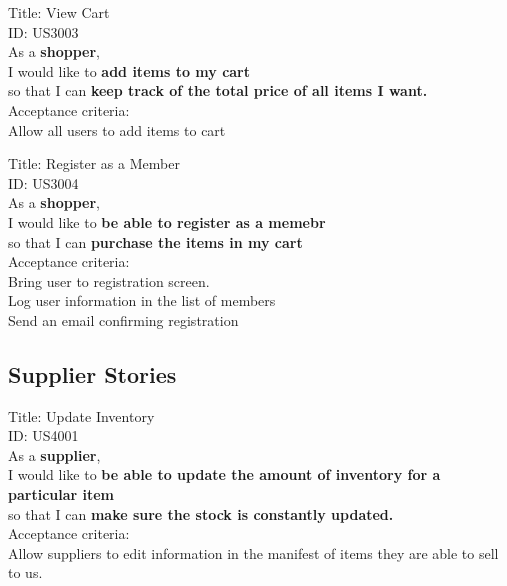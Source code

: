 \documentclass{article}
\begin{document}
\begin{framed}
\noindent
Title: View Cart \\
ID: US3003 \\
As a \textbf{shopper},\\
 \textbullet  \quad \quad I would like to \textbf{add items to my cart}\\ 
 \textbullet  \quad \quad so that I can \textbf{keep track of the total price of all items I want.}\\
 Acceptance criteria: \\
  \textbullet  \quad \quad Allow all users to add items to cart \\
\end{framed}


\begin{framed}
\noindent
Title: Register as a Member\\
ID: US3004 \\
As a \textbf{shopper},\\
 \textbullet  \quad \quad I would like to \textbf{be able to register as a memebr}\\ 
 \textbullet  \quad \quad so that I can \textbf{purchase the items in my cart}\\
 Acceptance criteria: \\
  \textbullet  \quad \quad Bring user to registration screen. \\
  \textbullet  \quad \quad Log user information in the list of members \\
  \textbullet  \quad \quad Send an email confirming registration \\
\end{framed}

\subsection{Supplier Stories}

\begin{framed}
\noindent
Title:  Update Inventory \\
ID: US4001 \\
As a \textbf{supplier},\\
 \textbullet  \quad \quad I would like to \textbf{be able to update the amount of inventory for a particular item }\\ 
 \textbullet  \quad \quad so that I can \textbf{make sure the stock is constantly updated.}\\
 Acceptance criteria: \\
  \textbullet  \quad \quad Allow suppliers to edit information in the manifest of items they are able to sell to us.
\end{framed}
\end{document}
